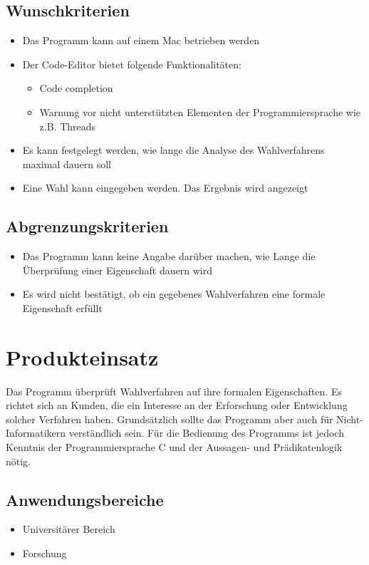 \documentclass[a4paper]{scrreprt}
\begin{document}
\section{Wunschkriterien}
\begin{itemize}
\item Das Programm kann auf einem Mac betrieben werden
\item Der Code-Editor bietet folgende Funktionalitäten:
	\begin{itemize}
	\item Code completion
	\item Warnung vor nicht unterstützten Elementen der Programmiersprache wie z.B. Threads
	\end{itemize}
\item Es kann festgelegt werden, wie lange die Analyse des Wahlverfahrens maximal dauern soll
\item Eine Wahl kann eingegeben werden. Das Ergebnis wird angezeigt
\end{itemize}

\section{Abgrenzungskriterien}
\begin{itemize}
\item Das Programm kann keine Angabe darüber machen, wie Lange die Überprüfung einer Eigenschaft dauern wird
\item Es wird nicht bestätigt, ob ein gegebenes Wahlverfahren eine formale Eigenschaft erfüllt
\end{itemize}



\chapter{Produkteinsatz}
Das Programm überprüft Wahlverfahren auf ihre formalen Eigenschaften. Es richtet sich an Kunden, die ein Interesse an der Erforschung oder Entwicklung solcher Verfahren haben. Grundsätzlich sollte das Programm aber auch für Nicht-Informatikern verständlich sein. Für die Bedienung des Programms ist jedoch Kenntnis der Programmiersprache C und der Aussagen- und Prädikatenlogik nötig.

\section{Anwendungsbereiche}
\begin{itemize}
\item Universitärer Bereich
\item Forschung
\end{itemize}
\end{document}
